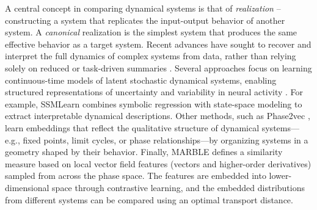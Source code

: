 \documentclass{article}
\newcommand{\ascomment}[1]{\textcolor{ascolor}{(#1)}}
\theoremstyle{definition} \newtheorem{definition}{Definition}  \newtheorem{example}{Example}
\theoremstyle{remark} \newtheorem{remark}{Remark}
\newcounter{ct}
\begin{document}






A central concept in comparing dynamical systems is that of \emph{realization} -- constructing a system that replicates the input-output behavior of another system\citep{grigoryeva2020dimension, gonon2023approximation}.
A \emph{canonical} realization is the simplest system that produces the same effective behavior as a target system.
%
Recent advances have sought to recover and interpret the full dynamics of complex systems from data, rather than relying solely on reduced or task-driven summaries \citep{durstewitz2023reconstructing, brenner2024almost}.
Several approaches focus on learning continuous-time models of latent stochastic dynamical systems, enabling structured representations of uncertainty and variability in neural activity \citep{duncker2019learning}.
For example, SSMLearn \citep{cenedese2022data} combines symbolic regression with state-space modeling to extract interpretable dynamical descriptions.
Other methods, such as Phase2vec \citep{ricci2022phase2vec}, learn embeddings that reflect the qualitative structure of dynamical systems—e.g., fixed points, limit cycles, or phase relationships—by organizing systems in a geometry shaped by their behavior.
Finally, MARBLE defines a similarity measure based on local vector field features (vectors and higher-order derivatives) sampled from across the phase space.
The features are embedded into lower-dimensional space through contrastive learning, and the embedded distributions from different systems can be compared using an optimal transport distance\citep{gosztolai2025marble}.
\end{document}
